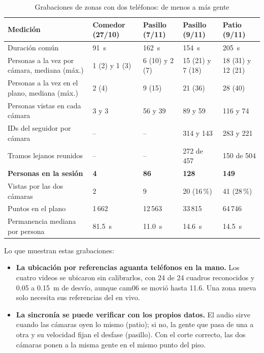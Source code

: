 \documentclass[12pt,a4paper]{article}
\begin{document}
\begin{table}[H]
\caption{Grabaciones de zonas con dos teléfonos: de menos a más gente}
\label{tab:mas-gente}
\centering
\footnotesize
\renewcommand{\arraystretch}{1.15}
\begin{tabular}{|L{0.30\textwidth}|R{0.13\textwidth}|R{0.13\textwidth}|R{0.13\textwidth}|R{0.13\textwidth}|}
\hline
\textbf{Medición} & \textbf{Comedor (27/10)} & \textbf{Pasillo (7/11)} & \textbf{Pasillo (9/11)} & \textbf{Patio (9/11)} \\
\hline
Duración común & 91~s & 162~s & 154~s & 205~s \\
\hline
Personas a la vez por cámara, mediana (máx.) & 1 (2) y 1 (3) & 6 (10) y 2 (7) & 15 (21) y 7 (18) & 18 (31) y 12 (21) \\
\hline
Personas a la vez en el plano, mediana (máx.) & 2 (4) & 9 (15) & 21 (36) & 28 (40) \\
\hline
Personas vistas en cada cámara & 3 y 3 & 56 y 39 & 89 y 59 & 116 y 74 \\
\hline
IDs del seguidor por cámara & -- & -- & 314 y 143 & 283 y 221 \\
\hline
Tramos lejanos reunidos & -- & -- & 272 de 457 & 150 de 504 \\
\hline
\textbf{Personas en la sesión} & \textbf{4} & \textbf{86} & \textbf{128} & \textbf{149} \\
\hline
Vistas por las dos cámaras & 2 & 9 & 20 (16\,\%) & 41 (28\,\%) \\
\hline
Puntos en el plano & 1\,662 & 12\,563 & 33\,815 & 64\,746 \\
\hline
Permanencia mediana por persona & 81.5~s & 11.0~s & 14.6~s & 14.5~s \\
\hline
\end{tabular}
\end{table}

Lo que muestran estas grabaciones:

\begin{itemize}
    \item \textbf{La ubicación por referencias aguanta teléfonos en la mano.}
    Los cuatro videos se ubicaron sin calibrarlos, con 24 de 24 cuadros
    reconocidos y 0.05 a 0.15~m de desvío, aunque cam06 se movió hasta
    11.6\textdegree{}. Una zona nueva solo necesita sus referencias del en vivo.
    \item \textbf{La sincronía se puede verificar con los propios datos.} El
    audio sirve cuando las cámaras oyen lo mismo (patio); si no, la gente que
    pasa de una a otra y su velocidad fijan el desfase (pasillo). Con el
    corte correcto, las dos cámaras ponen a la misma gente en el mismo punto
    del piso.
\end{itemize}
\end{document}
